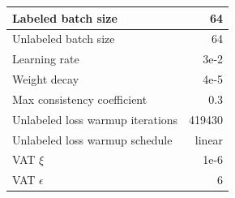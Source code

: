 \begin{tabular}{L{\WWW}  R{\RRR}}
\\ \hline
Labeled batch size & 64
\\ \hline
Unlabeled batch size & 64
\\ \hline
Learning rate & 3e-2
\\ \hline
Weight decay & 4e-5
\\ \hline
Max consistency coefficient & 0.3
\\ \hline
Unlabeled loss warmup iterations & 419430
\\ \hline
Unlabeled loss warmup schedule & linear
\\ \hline
VAT $\xi$ & 1e-6
\\ \hline
VAT $\epsilon$ & 6
\end{tabular}